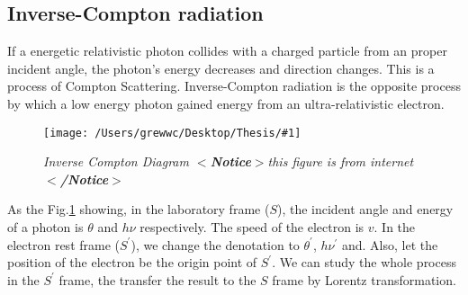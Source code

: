 \documentclass[12pt]{report}
\newcommand{\mycaption}[1]{\caption{\textit{\footnotesize #1}}}
\newcommand{\singleFig}[3]{
 \begin{figure}[!ht]
  \centering
  \texttt{[image: /Users/grewwc/Desktop/Thesis/\#1]}
  \mycaption{#3}
 \label{fig: #1}
 \end{figure}
}
\newcommand{\Notice}[1]{
  $<$\textbf{Notice}$>$#1$<$\textbf{/Notice}$>$
}
\begin{document}
          \subsection{Inverse-Compton radiation}
          If a energetic relativistic photon collides with a charged particle from an proper incident angle,
          the photon's energy decreases and direction changes. This is a process of Compton Scattering. 
          Inverse-Compton radiation is the opposite process by which a low energy photon gained energy 
          from an ultra-relativistic electron. 

          \singleFig{inverse_compton}{0.45}{Inverse Compton Diagram \Notice{this figure is from internet}}
          
          As the Fig.\ref{fig: inverse_compton} showing, in the laboratory frame ($S$), the incident angle and 
          energy of a photon is $\theta$ and $h \nu$ respectively. The speed of the electron is $v$. In the 
          electron rest frame ($S^{\prime}$), we change the denotation to $\theta^{\prime}$, $h \nu^{\prime}$ and.
          Also, let the position of the electron be the origin point of $S^{\prime}$.
          We can study the whole process in the $S^{\prime}$ frame, the transfer the result 
          to the $S$ frame by Lorentz transformation. 
\end{document}
